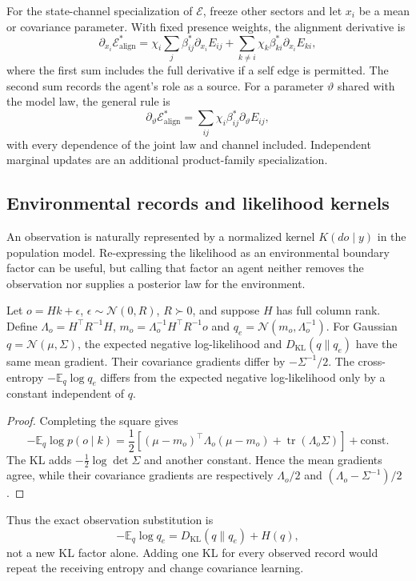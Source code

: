 For the state-channel specialization of $\mathcal E$, freeze other sectors and let $x_i$ be a mean or covariance parameter. With fixed presence weights, the alignment derivative is
\begin{equation}
\partial_{x_i}\mathcal E_{\mathrm{align}}^*
=\chi_i\sum_j\beta_{ij}^*\partial_{x_i}E_{ij}
+\sum_{k\ne i}\chi_k\beta_{ki}^*\partial_{x_i}E_{ki},
\label{eq:envelope_gradient_belief}
\end{equation}
where the first sum includes the full derivative if a self edge is permitted. The second sum records the agent's role as a source. For a parameter $\vartheta$ shared with the model law, the general rule is
\begin{equation}
\partial_\vartheta\mathcal E_{\mathrm{align}}^*
=\sum_{ij}\chi_i\beta_{ij}^*\partial_\vartheta E_{ij},
\label{eq:envelope_gradient_model}
\end{equation}
with every dependence of the joint law and channel included. Independent marginal updates are an additional product-family specialization.

\subsection{Environmental records and likelihood kernels}
An observation is naturally represented by a normalized kernel $K(do\mid y)$ in the population model. Re-expressing the likelihood as an environmental boundary factor can be useful, but calling that factor an agent neither removes the observation nor supplies a posterior law for the environment.

\begin{proposition}\label{prop:gaussian_sensor_equivalence}
Let $o=Hk+\epsilon$, $\epsilon\sim\mathcal N(0,R)$, $R\succ0$, and suppose $H$ has full column rank. Define
$\Lambda_o=H^\top R^{-1}H$,
$m_o=\Lambda_o^{-1}H^\top R^{-1}o$ and
$q_e=\mathcal N(m_o,\Lambda_o^{-1})$.
For Gaussian $q=\mathcal N(\mu,\Sigma)$, the expected negative log-likelihood and $D_{\mathrm{KL}}(q\|q_e)$ have the same mean gradient. Their covariance gradients differ by $-\Sigma^{-1}/2$. The cross-entropy $-\mathbb E_q\log q_e$ differs from the expected negative log-likelihood only by a constant independent of $q$.
\end{proposition}
\begin{proof}
Completing the square gives
\begin{equation}
-\mathbb E_q\log p(o\mid k)
=\frac12[(\mu-m_o)^\top\Lambda_o(\mu-m_o)
+\operatorname{tr}(\Lambda_o\Sigma)]+\mathrm{const}.
\end{equation}
The KL adds $-\frac12\log\det\Sigma$ and another constant. Hence the mean gradients agree, while their covariance gradients are respectively $\Lambda_o/2$ and $(\Lambda_o-\Sigma^{-1})/2$.
\end{proof}
Thus the exact observation substitution is
\begin{equation}
-\mathbb E_q\log q_e=D_{\mathrm{KL}}(q\|q_e)+H(q),
\label{eq:xent_resolution}
\end{equation}
not a new KL factor alone. Adding one KL for every observed record would repeat the receiving entropy and change covariance learning.

